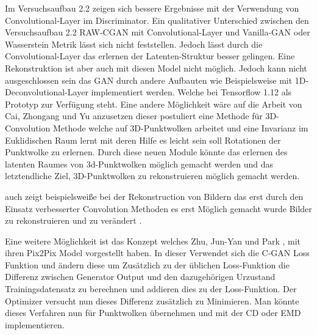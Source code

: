 \documentclass{llncs}
\begin{document}
Im Versuchsaufbau 2.2 zeigen sich bessere Ergebnisse mit der Verwendung von Convolutional-Layer im Discriminator. Ein qualitativer Unterschied zwischen den Versuchsaufbau 2.2 RAW-CGAN mit Convolutional-Layer und Vanilla-GAN oder Wasserstein Metrik lässt sich nicht feststellen. Jedoch lässt durch die Convolutional-Layer das erlernen der Latenten-Struktur besser gelingen. Eine Rekonstruktion ist aber auch mit diesen Model nicht möglich. Jedoch kann nicht ausgeschlossen sein das GAN durch andere Aufbauten wie Beispielsweise mit 1D-Deconvolutional-Layer implementiert werden. Welche bei Tensorflow 1.12 als Prototyp zur Verfügung steht. Eine andere Möglichkeit wäre auf die Arbeit von Cai, Zhongang  und Yu \cite{3d-conv} anzusetzen dieser postuliert eine Methode für 3D-Convolution Methode welche auf 3D-Punktwolken arbeitet und eine Invarianz im Euklidischen Raum lernt mit deren Hilfe es leicht sein soll Rotationen der Punktwolke zu erlernen. Durch diese neuen Module könnte das erlernen des latenten Raumes von 3d-Punktwolken möglich gemacht werden und das letztendliche Ziel, 3D-Punktwolken zu rekonstruieren möglich gemacht werden. 


auch zeigt beispielsweiße bei der Rekonstruction von Bildern das erst durch den Einsatz verbesserter Convolution Methoden es erst Möglich gemacht wurde Bilder zu rekonstruieren und zu verändert \cite{imagerecon}.

Eine weitere Möglichkeit ist das Konzept welches Zhu, Jun-Yan und Park \cite{pix2pix}, mit ihren Pix2Pix Model vorgestellt haben. In dieser Verwendet sich die C-GAN Loss Funktion und ändern diese um Zusätzlich zu der üblichen Loss-Funktion die Differenz zwischen Generator Output und den dazugehörigen Urzustand Trainingsdatensatz zu berechnen und addieren dies zu der Loss-Funktion. Der Optimizer versucht nun dieses Differenz zusätzlich zu Minimieren. Man könnte dieses Verfahren nun für Punktwolken übernehmen und mit der CD oder EMD implementieren. 
\end{document}
